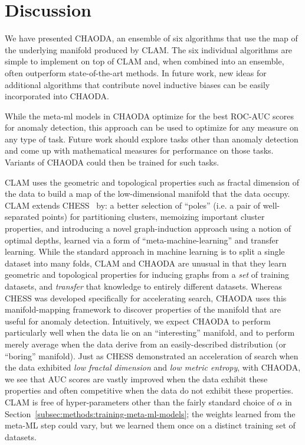 \section{Discussion}
\label{sec:discussion}

We have presented CHAODA, an ensemble of six algorithms that use the map of the underlying manifold produced by CLAM\@.
The six individual algorithms are simple to implement on top of CLAM and, when combined into an ensemble, often outperform state-of-the-art methods.
In future work, new ideas for additional algorithms that contribute novel inductive biases can be easily incorporated into CHAODA.

While the meta-ml models in CHAODA optimize for the best ROC-AUC scores for anomaly detection, this approach can be used to optimize for any measure on any type of task.
Future work should explore tasks other than anomaly detection and come up with mathematical measures for performance on those tasks.
Variants of CHAODA could then be trained for such tasks.

CLAM uses the geometric and topological properties such as fractal dimension of the data to build a map of the low-dimensional manifold that the data occupy.
CLAM extends CHESS~\cite{ishaq2019clustered} by:
a better selection of ``poles'' (i.e. a pair of well-separated points) for partitioning clusters,
memoizing important cluster properties, and
introducing a novel graph-induction approach using a notion of optimal depths, learned via a form of ``meta-machine-learning'' and transfer learning.
While the standard approach in machine learning is to split a single dataset into many folds, CLAM and CHAODA are unusual in that they learn geometric and topological properties for inducing graphs from a \emph{set} of training datasets, and \emph{transfer} that knowledge to entirely different datasets.
Whereas CHESS was developed specifically for accelerating search,
CHAODA uses this manifold-mapping framework to discover properties of the manifold that are useful for anomaly detection.
Intuitively, we expect CHAODA to perform particularly well when the data lie on an ``interesting'' manifold, and to perform merely average when the data derive from an easily-described distribution (or ``boring'' manifold).
Just as CHESS demonstrated an acceleration of search when the data exhibited \emph{low fractal dimension} and \emph{low metric entropy}, with CHAODA, we see that AUC scores are vastly improved when the data exhibit these properties and often competitive when the data do not exhibit these properties.
CLAM is free of hyper-parameters other than the fairly standard choice of $\alpha$ in Section~\ref{subsec:methods:training-meta-ml-models}; the weights learned from the meta-ML step could vary, but we learned them once on a distinct training set of datasets.

